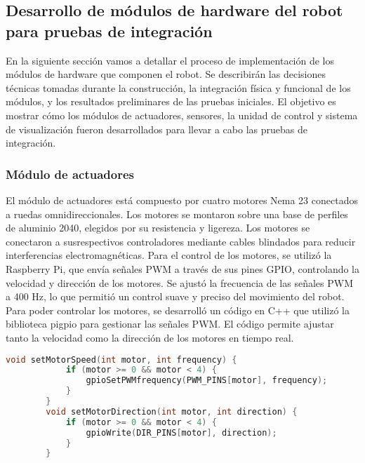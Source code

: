 \subsection{Desarrollo de m\'odulos de hardware del robot para pruebas de integraci\'on}
\label{sec:Desarrollo de m\'odulos de hardware del robot para pruebas de integraci\'on}
    En la siguiente secci\'on vamos a detallar el proceso de implementaci\'on de los m\'odulos
        de hardware que componen el robot. Se describir\'an las decisiones t\'ecnicas tomadas
        durante la construcci\'on, la integraci\'on f\'isica y funcional de los m\'odulos, y los
        resultados preliminares de las pruebas iniciales. El objetivo es mostrar c\'omo los
        m\'odulos de actuadores, sensores, la unidad de control y sistema de visualizaci\'on
        fueron desarrollados para llevar a cabo las pruebas de integraci\'on.
    \vskip 0.5cm
    \subsubsection{M\'odulo de actuadores}
    El m\'odulo de actuadores est\'a compuesto por cuatro motores Nema 23 conectados a
        ruedas omnidireccionales. Los motores se montaron sobre una base de perfiles de
        aluminio 2040, elegidos por su resistencia y ligereza. Los motores se conectaron a susrespectivos controladores mediante cables blindados para reducir interferencias
        electromagn\'eticas.
    \vskip 0.5cm
    Para el control de los motores, se utiliz\'o la Raspberry Pi, que env\'ia se\~nales PWM a
        trav\'es de sus pines GPIO, controlando la velocidad y direcci\'on de los motores. Se
        ajust\'o la frecuencia de las se\~nales PWM a 400 Hz, lo que permiti\'o un control suave y
        preciso del movimiento del robot.
    \vskip 0.5cm
    Para poder controlar los motores, se desarroll\'o un c\'odigo en C++ que utiliz\'o la
        biblioteca pigpio para gestionar las se\~nales PWM. El c\'odigo permite ajustar tanto la
        velocidad como la direcci\'on de los motores en tiempo real.
    \vskip 0.5cm
    \begin{lstlisting}[language={C++}, caption={C\'odigo de ejemplo de motores}, label={Script}]
        void setMotorSpeed(int motor, int frequency) {
            if (motor >= 0 && motor < 4) {
                gpioSetPWMfrequency(PWM_PINS[motor], frequency);
            }
        }
        void setMotorDirection(int motor, int direction) {
            if (motor >= 0 && motor < 4) {
                gpioWrite(DIR_PINS[motor], direction);
            }
        }
    \end{lstlisting}
    \vskip 0.5cm
